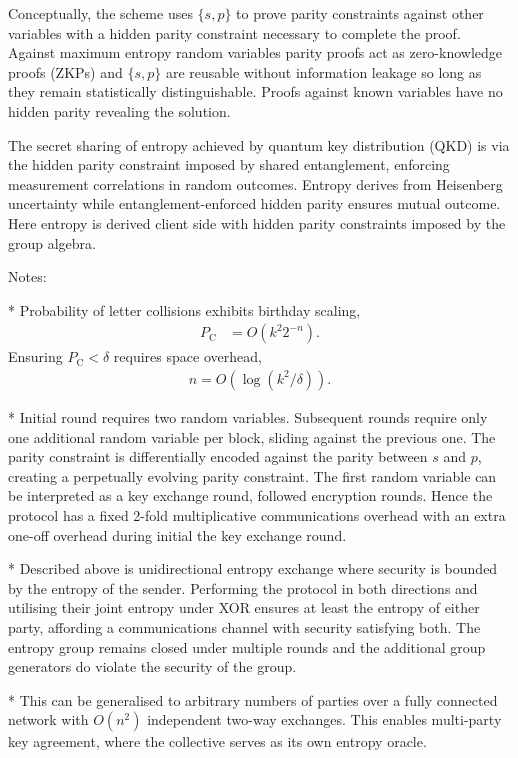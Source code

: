 \documentclass[twocolumn, aps, amsmath, amssymb, nofootinbib, superscriptaddress, longbibliography, doublefloatfix, table-of-contents, eqsecnum, rmp]{revtex4-2}
\begin{document}
Conceptually, the scheme uses $\{s,p\}$ to prove parity constraints against other variables with a hidden parity constraint necessary to complete the proof. Against maximum entropy random variables parity proofs act as zero-knowledge proofs (ZKPs) and $\{s,p\}$ are reusable without information leakage so long as they remain statistically distinguishable. Proofs against known variables have no hidden parity revealing the solution.

The secret sharing of entropy achieved by quantum key distribution (QKD) is via the hidden parity constraint imposed by shared entanglement, enforcing measurement correlations in random outcomes. Entropy derives from Heisenberg uncertainty while entanglement-enforced hidden parity ensures mutual outcome. Here entropy is derived client side with hidden parity constraints imposed by the group algebra.

Notes:

* Probability of letter collisions exhibits birthday scaling,
\begin{align}
	P_\mathrm{C} &= O(k^2 2^{-n}).
\end{align}
Ensuring $P_\mathrm{C}< \delta$ requires space overhead,
\begin{align}
	n = O(\log(k^2/\delta)).
\end{align}

* Initial round requires two random variables. Subsequent rounds require only one additional random variable per block,  sliding against the previous one. The parity constraint is differentially encoded against the parity between $s$ and $p$, creating a perpetually evolving parity constraint. The first random variable can be interpreted as a key exchange round, followed encryption rounds. Hence the protocol has a fixed 2-fold multiplicative communications overhead with an extra one-off overhead during initial the key exchange round.

* Described above is unidirectional entropy exchange where security is bounded by the entropy of the sender. Performing the protocol in both directions and utilising their joint entropy under XOR ensures at least the entropy of either party, affording a communications channel with security satisfying both. The entropy group remains closed under multiple rounds and the additional group generators do violate the security of the group.

* This can be generalised to arbitrary numbers of parties over a fully connected network with $O(n^2)$ independent two-way exchanges. This enables multi-party key agreement, where the collective serves as its own entropy oracle.
\end{document}
